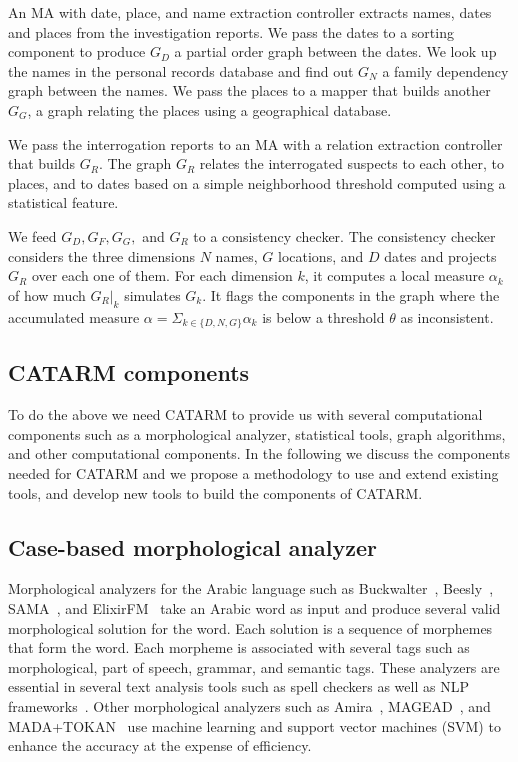 \documentclass[12pt]{article}
\begin{document}
{An MA with date, place, and name extraction controller extracts
names, dates and places from the investigation reports. 
We pass the dates to a sorting component to produce $G_D$ 
a partial order graph between the dates. 
We look up the names in the personal records database and find out
$G_N$ a family dependency graph between the names. 
We pass the places to a mapper that builds another $G_G$,
a graph relating the places using a geographical database. 

We pass the interrogation reports to an MA with a relation 
extraction controller that builds $G_R$. 
The graph $G_R$ relates the interrogated suspects
to each other, to places, and to dates based on a simple
neighborhood threshold computed using a statistical feature. 

We feed $G_D, G_F, G_G,$ and $G_R$   
to a consistency checker.
The consistency checker considers the three dimensions 
$N$ names, $G$ locations, and $D$ dates and projects $G_R$
over each one of them.
For each dimension $k$, it computes a local measure 
$\alpha_k$ of how much $G_R|_k$ simulates $G_k$. 
It flags the components in the graph where the accumulated 
measure $\alpha= \Sigma_{k\in\{D,N,G\}} \alpha_k$ is
below a threshold $\theta$ as inconsistent. 

\subsection{CATARM components}
\label{s:design:components}

To do the above we need CATARM to provide us with several 
computational components such as a morphological analyzer, 
statistical tools, graph algorithms, and other computational
components. 
In the following we discuss the components needed for 
CATARM and we propose a methodology to 
use and extend existing tools, and develop new tools to
build the components of CATARM.

\subsection{Case-based morphological analyzer}

Morphological analyzers for the Arabic language
such as Buckwalter~\cite{Buckwalter:02},
Beesly~\cite{Beesley:01}, SAMA~\cite{Kulick:10},
and ElixirFM~\cite{Otakar:07} take an Arabic word as input
and produce several valid morphological solution for the word. 
Each solution is a sequence of morphemes that form the word.
Each morpheme is associated with several tags such as 
morphological, part of speech, grammar, and semantic tags. 
These analyzers are essential in several text analysis tools such 
as spell checkers as well as NLP frameworks~\cite{Col09}.
Other morphological analyzers such as 
Amira~\cite{Diab:07,Benajiba:07},
MAGEAD~\cite{Habash:05}, and MADA+TOKAN~\cite{Habash:09} 
use machine learning and support vector machines (SVM) 
to enhance the accuracy at the expense of efficiency.

}
\end{document}
